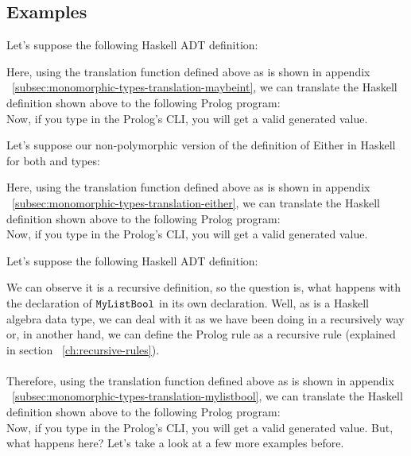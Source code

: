\subsection{Examples} \label{ch:monomorphic-types-examples}
\begin{example}[MaybeInt]
	Let's suppose the following Haskell ADT definition:
	
	Here, using the translation function defined above as is shown in appendix ~\ref{subsec:monomorphic-types-translation-maybeint}, we can translate the Haskell definition shown above to the following Prolog program:\\
	
	Now, if you type  in the Prolog's CLI, you will get a valid  generated value.
\end{example}
\begin{example}
	Let's suppose our non-polymorphic version of the definition of Either in Haskell for both  and  types:
	
	Here, using the translation function defined above as is shown in appendix ~\ref{subsec:monomorphic-types-translation-either}, we can translate the Haskell definition shown above to the following Prolog program:\\
	
	Now, if you type  in the Prolog's CLI, you will get a valid  generated value.
\end{example}
\begin{example}[MyListBool]
	Let's suppose the following Haskell ADT definition:
	
	We can observe it is a recursive definition, so the question is, what happens with the declaration of $\texttt{MyListBool}$ in its own declaration. Well, as  is a Haskell algebra data type, we can deal with it as we have been doing in a recursively way or, in another hand, we can define the Prolog rule as a recursive rule (explained in section ~\ref{ch:recursive-rules}).\\\\
	Therefore, using the translation function defined above as is shown in appendix ~\ref{subsec:monomorphic-types-translation-mylistbool}, we can translate the Haskell definition shown above to the following Prolog program:\\
	
	Now, if you type  in the Prolog's CLI, you will get a valid  generated value. But, what happens here? Let's take a look at a few more examples before.
\end{example}
